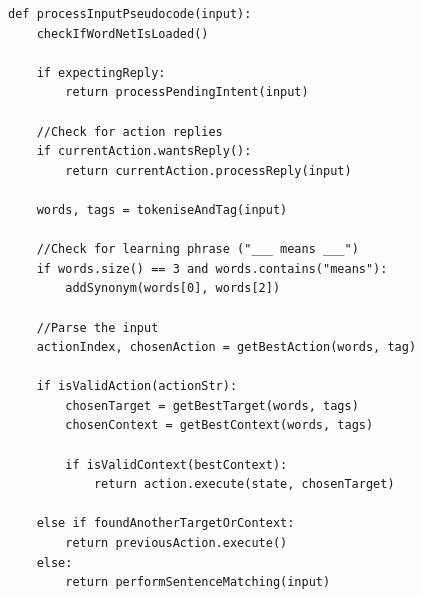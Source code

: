 \documentclass[11pt]{article}
\begin{document}
\begin{appendices}
\begin{lstlisting}[caption=Pseudocode for processInput(), label={lst:voice-process-pseudo}]
def processInputPseudocode(input):
    checkIfWordNetIsLoaded()
    
    if expectingReply:
        return processPendingIntent(input)
    
    //Check for action replies
    if currentAction.wantsReply():
        return currentAction.processReply(input)
    
    words, tags = tokeniseAndTag(input)
    
    //Check for learning phrase ("___ means ___")
    if words.size() == 3 and words.contains("means"):
        addSynonym(words[0], words[2])
    
    //Parse the input
    actionIndex, chosenAction = getBestAction(words, tag)
    
    if isValidAction(actionStr):
        chosenTarget = getBestTarget(words, tags)
        chosenContext = getBestContext(words, tags)
        
        if isValidContext(bestContext):
            return action.execute(state, chosenTarget)
            
    else if foundAnotherTargetOrContext:
        return previousAction.execute()
    else:
        return performSentenceMatching(input)
\end{lstlisting}

\end{appendices}
\newpage
{}

\end{document}
